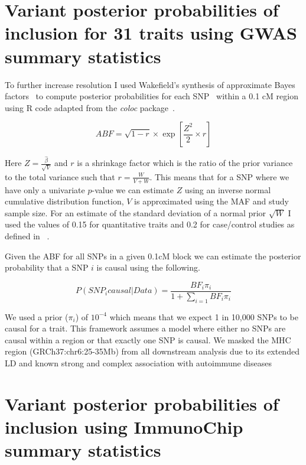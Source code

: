 \documentclass[a4paper,11pt]{report}
\begin{document}
\section{Variant posterior probabilities of inclusion for 31 traits using GWAS summary statistics}
To further increase resolution I used Wakefield’s synthesis of approximate Bayes factors~\citep{Wakefield2009}  to compute posterior probabilities for each SNP~\citep{The_Wellcome_Trust_Case_Control_Consortium2012-ad} within a 0.1 cM region using R code adapted from the \textit{coloc} package~\citep{GiambartolomeiVukcevicSchadtEtAl2014}.  

\begin{equation}
	ABF =  \sqrt{1 - r} \times \exp{[\frac{Z^{2}}{2} \times r]}
\end{equation}

Here $Z= \frac{\hat{\beta}}{\sqrt{V}}$ and $r$ is a shrinkage factor which is the ratio of the prior variance to the total variance such that $r = \frac{W}{V + W}$. This means that for a SNP where we have only a univariate $p$-value we can estimate $Z$ using an inverse normal cumulative distribution function, $V$ is approximated using the MAF and study sample size. For an estimate of the standard deviation of a normal prior $\sqrt{W}$ I used the values of 0.15 for quantitative traits and 0.2 for case/control studies as defined in ~\citep{GiambartolomeiVukcevicSchadtEtAl2014}.  

Given the ABF for all SNPs in a given 0.1cM block we can estimate the posterior probability that a SNP $i$  is causal using the following.

\begin{equation}
	P(SNP_{i} causal | Data) = \frac{BF_{i}\pi_{i}}{1 + \sum_{i=1} BF_{i}\pi_{i}}
\end{equation}

We used a prior ($\pi_{i}$) of $10^{-4}$ which means that we expect 1 in 10,000 SNPs to be causal for a trait. This framework assumes a model where either no SNPs are causal within a region or that exactly one SNP is causal. We masked the MHC region (GRCh37:chr6:25-35Mb) from all downstream analysis due to its extended LD and known strong and complex association with autoimmune diseases

\section{Variant posterior probabilities of inclusion using ImmunoChip summary statistics}
\end{document}
